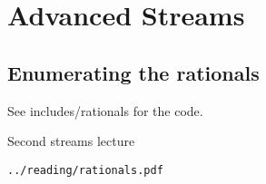 \chapter{Advanced Streams}
\startlecture


\section{Enumerating the rationals}

See includes/rationals for the code.



Second streams lecture

\texttt{../reading/rationals.pdf}
